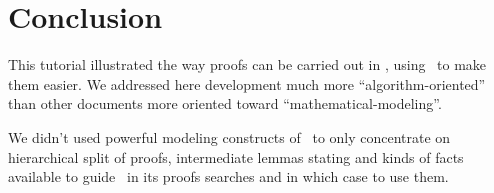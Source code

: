 \section{Conclusion}
This tutorial illustrated the way proofs can be carried out in \focal,
using \zenon\ to make them easier. We addressed here development much
more ``algorithm-oriented'' than other documents more oriented toward
``mathematical-modeling''.

We didn't used powerful modeling constructs of \focal\ to only
concentrate on hierarchical split of proofs, intermediate lemmas
stating and kinds of facts available to guide \zenon\ in its proofs
searches and in which case to use them.

